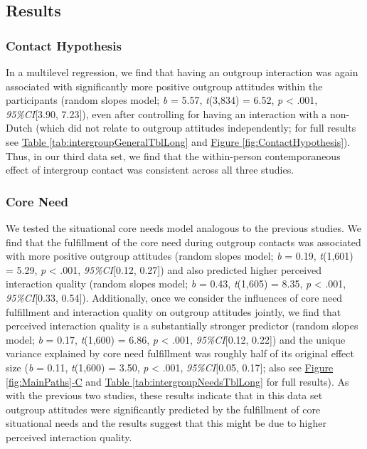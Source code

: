\documentclass[man, 12pt, a4paper, mask]{apa7}
\theoremstyle{break}
\theoremstyle{plain}
\newcommand{\fgrref}[2][]{\hyperref[#2]{Figure \ref*{#2}#1}}
\newcommand{\tblref}[2][]{\hyperref[#2]{Table \ref*{#2}#1}}
\begin{document}
\subsection{Results}

\subsubsection{Contact Hypothesis}

In a multilevel regression, we find that having an outgroup interaction
was again associated with significantly more positive outgroup attitudes
within the participants (random slopes model; \textit{b} = 5.57,
\textit{t}(3,834) = 6.52, \textit{p} \textless{} .001,
\textit{95\%CI}{[}3.90, 7.23{]}), even after controlling for having an
interaction with a non-Dutch (which did not relate to outgroup attitudes
independently; for full results see
\tblref{tab:intergroupGeneralTblLong} and
\fgrref{fig:ContactHypothesis}). Thus, in our third data set, we find
that the within-person contemporaneous effect of intergroup contact was
consistent across all three studies.

\subsubsection{Core Need}

We tested the situational core needs model analogous to the previous
studies. We find that the fulfillment of the core need during outgroup
contacts was associated with more positive outgroup attitudes (random
slopes model; \textit{b} = 0.19, \textit{t}(1,601) = 5.29, \textit{p}
\textless{} .001, \textit{95\%CI}{[}0.12, 0.27{]}) and also predicted
higher perceived interaction quality (random slopes model; \textit{b} =
0.43, \textit{t}(1,605) = 8.35, \textit{p} \textless{} .001,
\textit{95\%CI}{[}0.33, 0.54{]}). Additionally, once we consider the
influences of core need fulfillment and interaction quality on outgroup
attitudes jointly, we find that perceived interaction quality is a
substantially stronger predictor (random slopes model; \textit{b} =
0.17, \textit{t}(1,600) = 6.86, \textit{p} \textless{} .001,
\textit{95\%CI}{[}0.12, 0.22{]}) and the unique variance explained by
core need fulfillment was roughly half of its original effect size
(\textit{b} = 0.11, \textit{t}(1,600) = 3.50, \textit{p} \textless{}
.001, \textit{95\%CI}{[}0.05, 0.17{]}; also see
\fgrref[-C]{fig:MainPaths} and \tblref{tab:intergroupNeedsTblLong} for
full results). As with the previous two studies, these results indicate
that in this data set outgroup attitudes were significantly predicted by
the fulfillment of core situational needs and the results suggest that
this might be due to higher perceived interaction quality.
\end{document}
